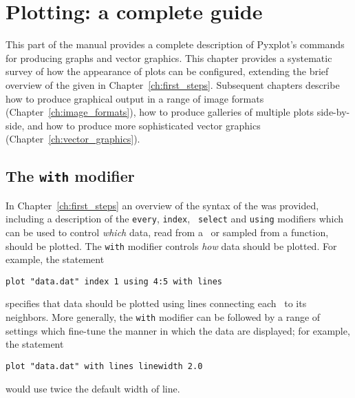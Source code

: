 %
%
%
%
%



\chapter{Plotting: a complete guide}
\label{ch:plotting}

This part of the manual provides a complete description of Pyxplot's commands
for producing graphs and vector graphics. This chapter provides a systematic
survey of how the appearance of plots can be configured, extending the brief
overview of the  given in Chapter~\ref{ch:first_steps}.
Subsequent chapters describe how to produce graphical output in a range of
image formats (Chapter~\ref{ch:image_formats}), how to produce galleries of
multiple plots side-by-side, and how to produce more sophisticated vector
graphics (Chapter~\ref{ch:vector_graphics}).

\section{The {\tt with} modifier}
\label{sec:with_modifier}

In Chapter~\ref{ch:first_steps} an overview of the syntax of the 
was provided, including a description of the {\tt every}, {\tt index}, {\tt
select} and {\tt using} modifiers which can be used to control {\it which}
data, read from a \datafile\ or sampled from a function, should be plotted. The
{\tt with} modifier controls {\it how} data should be plotted. For example, the
statement
\begin{verbatim}
plot "data.dat" index 1 using 4:5 with lines
\end{verbatim}
specifies that data should be plotted using lines connecting each \datapoint\ to
its neighbors. More generally, the {\tt with} modifier can be followed by a
range of settings which fine-tune the manner in which the data are displayed;
for example, the statement
\begin{verbatim}
plot "data.dat" with lines linewidth 2.0
\end{verbatim}
would use twice the default width of line.

